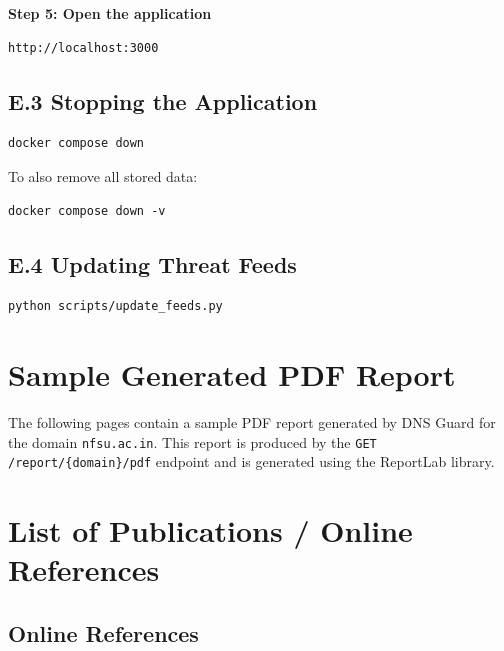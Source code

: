 \documentclass[12pt, a4paper, oneside]{report}
\begin{document}
\textbf{Step 5: Open the application}
\begin{verbatim}
http://localhost:3000
\end{verbatim}

\section*{E.3 Stopping the Application}
\begin{verbatim}
docker compose down
\end{verbatim}
To also remove all stored data:
\begin{verbatim}
docker compose down -v
\end{verbatim}

\section*{E.4 Updating Threat Feeds}
\begin{verbatim}
python scripts/update_feeds.py
\end{verbatim}

\newpage

\chapter{Sample Generated PDF Report}
\label{app:pdfreport}

The following pages contain a sample PDF report generated by DNS Guard for the domain \texttt{nfsu.ac.in}. This report is produced by the \texttt{GET /report/\{domain\}/pdf} endpoint and is generated using the ReportLab library.



\chapter*{List of Publications / Online References}

\section*{Online References}
\end{document}
